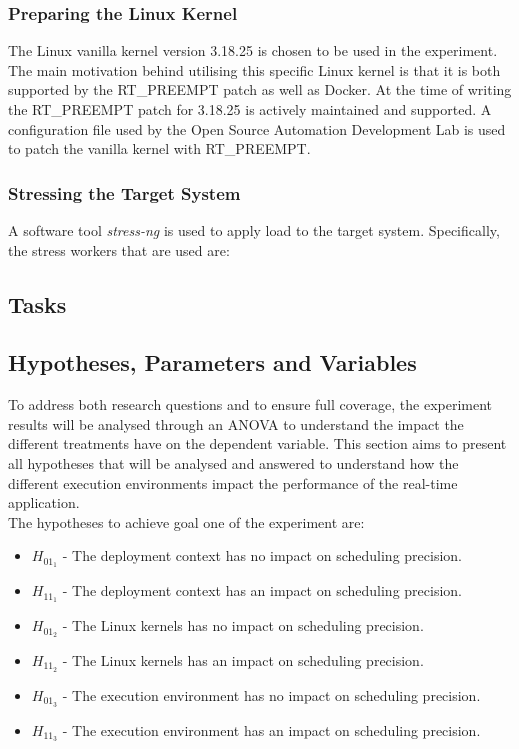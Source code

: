\subsubsection{Preparing the Linux Kernel}
The Linux vanilla kernel version 3.18.25 is chosen to be used in the experiment. The main motivation behind utilising this specific Linux kernel is that it is both supported by the RT\_PREEMPT patch as well as Docker. At the time of writing the RT\_PREEMPT patch for 3.18.25 is actively maintained and supported. A configuration file used by the Open Source Automation Development Lab \cite{OSADL} is used to patch the vanilla kernel with RT\_PREEMPT.

\subsubsection{Stressing the Target System}
A software tool \textit{stress-ng} is used to apply load to the target system. Specifically, the stress workers that are used are:  



\subsection{Tasks}


\subsection{Hypotheses, Parameters and Variables}
To address both research questions and to ensure full coverage, the experiment results will be analysed through an ANOVA to understand the impact the different treatments have on the dependent variable. This section aims to present all hypotheses that will be analysed and answered to understand how the different execution environments impact the performance of the real-time application.\\

The hypotheses to achieve goal one of the experiment are:
\begin{itemize}
\item $H_{01_{1}}$ - The deployment context has no impact on scheduling precision.
\item $H_{11_{1}}$ - The deployment context has an impact on scheduling precision.
\item $H_{01_{2}}$ - The Linux kernels has no impact on scheduling precision.
\item $H_{11_{2}}$ - The Linux kernels has an impact on scheduling precision.
\item $H_{01_{3}}$ - The execution environment has no impact on scheduling precision.
\item $H_{11_{3}}$ - The execution environment has an impact on scheduling precision.\\
\end{itemize}



